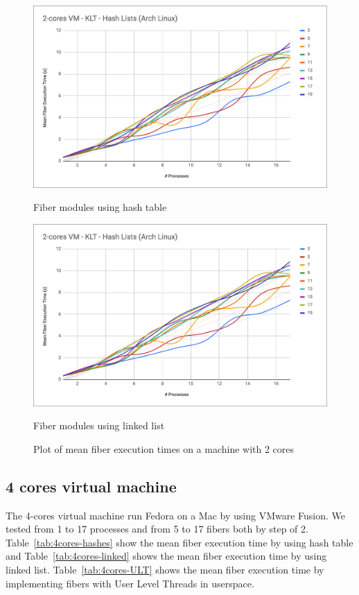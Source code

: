 \documentclass[a4paper,10pt]{article}
\begin{document}
 \begin{figure}[htb!]
   \centering
   \begin{minipage}{0.45\textwidth}%
     \centering
     \includegraphics[width=\textwidth]{imgs/bench-2cores-hash}
     \caption{Fiber modules using hash table}
     \label{fig:2figsA}
   \end{minipage}%
   \qquad
   \begin{minipage}{0.45\textwidth}%
     \centering
     \includegraphics[width=\textwidth]{imgs/bench-2cores-hash}
     \caption{Fiber modules using linked list}
     \label{fig:2figsB}%
   \end{minipage}%
   \caption{Plot of mean fiber execution times on a machine with 2 cores}
 \end{figure}


 \subsection{4 cores virtual machine}
 The 4-cores virtual machine run Fedora on a Mac by using VMware Fusion. We tested from 1 to 17 processes and from 5 to 17 fibers both by step of 2. Table~\ref{tab:4cores-hashes} show the mean fiber execution time by using hash table and Table~\ref{tab:4cores-linked} shows the mean fiber execution time by using linked list. Table~\ref{tab:4cores-ULT} shows the mean fiber execution time by implementing fibers with User Level Threads in userspace.
\end{document}

